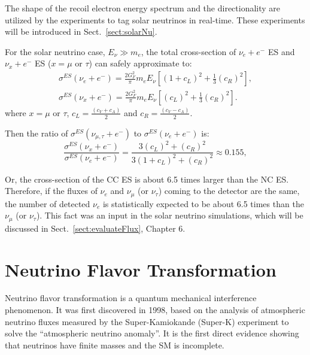 The shape of the recoil electron energy spectrum and the directionality are utilized by the experiments to tag solar neutrinos in real-time\cite{suzuki2020sun}. These experiments will be introduced in Sect.~\ref{sect:solarNu}.

For the solar neutrino case, $E_\nu\gg m_e$, the total cross-section of $\nu_e+e^-$ ES and $\nu_x+e^-$ ES ($x=\mu$ or $\tau$) can safely approximate to\cite{xing2011neutrinos}:
\begin{equation}
\begin{aligned}
\sigma^{ES}(\nu_e+e^-) = \frac{2G_F^2}{\pi}m_e E_\nu \left[(1+c_L)^2+\frac{1}{3}(c_R)^2\right],\\
\sigma^{ES}(\nu_x+e^-) = \frac{2G_F^2}{\pi}m_e E_\nu \left[(c_L)^2+\frac{1}{3}(c_R)^2\right].
\end{aligned}
\end{equation}
where $x=\mu$ or $\tau$, $c_L=\frac{(c_V+c_A)}{2}$ and $c_R = \frac{(c_V-c_A)}{2}$.

Then the ratio of $\sigma^{ES}(\nu_{\mu,\tau}+e^-)$ to $\sigma^{ES}(\nu_e+e^-)$ is\cite{xing2011neutrinos}:
\begin{equation}
\frac{\sigma^{ES}(\nu_{x}+e^-)}{\sigma^{ES}(\nu_e+e^-)} = \frac{3(c_L)^2+({c_R})^2}{3(1+c_L)^2+(c_R)^2} \approx 0.155,
\end{equation}

Or, the cross-section of the CC ES is about 6.5 times larger than the NC ES. Therefore, if the fluxes of $\nu_e$ and $\nu_{\mu}$ (or $\nu_\tau$) coming to the detector are the same, the number of detected $\nu_e$ is statistically expected to be about 6.5 times than the $\nu_{\mu}$ (or $\nu_\tau$). This fact was an input in the solar neutrino simulations, which will be discussed in Sect.~\ref{sect:evaluateFlux}, Chapter 6. 


\section{Neutrino Flavor Transformation}
Neutrino flavor transformation is a quantum mechanical interference phenomenon\cite{akhmedov2019quantum}. It was first discovered in 1998, based on the analysis of atmospheric neutrino fluxes measured by the Super-Kamiokande (Super-K) experiment to solve the ``atmospheric neutrino anomaly''\cite{fukuda1998evidence}. It is the first direct evidence showing that neutrinos have finite masses and the SM is incomplete.

